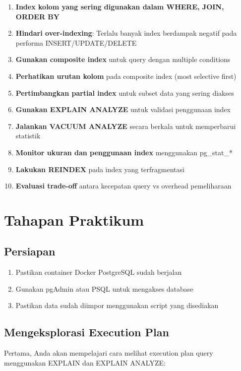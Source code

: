\begin{enumerate}
    \item \textbf{Index kolom yang sering digunakan dalam WHERE, JOIN, ORDER BY}
    \item \textbf{Hindari over-indexing}: Terlalu banyak index berdampak negatif pada performa INSERT/UPDATE/DELETE
    \item \textbf{Gunakan composite index} untuk query dengan multiple conditions
    \item \textbf{Perhatikan urutan kolom} pada composite index (most selective first)
    \item \textbf{Pertimbangkan partial index} untuk subset data yang sering diakses
    \item \textbf{Gunakan EXPLAIN ANALYZE} untuk validasi penggunaan index
    \item \textbf{Jalankan VACUUM ANALYZE} secara berkala untuk memperbarui statistik
    \item \textbf{Monitor ukuran dan penggunaan index} menggunakan pg\_stat\_*
    \item \textbf{Lakukan REINDEX} pada index yang terfragmentasi
    \item \textbf{Evaluasi trade-off} antara kecepatan query vs overhead pemeliharaan
\end{enumerate}

\section{Tahapan Praktikum}

\subsection{Persiapan}
\begin{enumerate}
	\item Pastikan container Docker PostgreSQL sudah berjalan
	\item Gunakan pgAdmin atau PSQL untuk mengakses database
	\item Pastikan data sudah diimpor menggunakan script yang disediakan
\end{enumerate}

\subsection{Mengeksplorasi Execution Plan}
Pertama, Anda akan mempelajari cara melihat execution plan query menggunakan EXPLAIN dan EXPLAIN ANALYZE:

